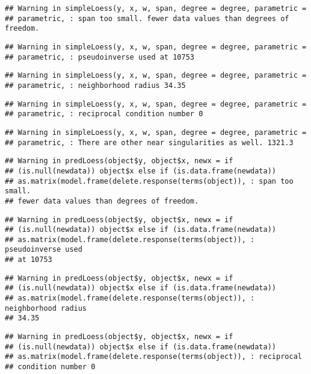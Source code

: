 \documentclass[]{article}
\begin{document}
\begin{verbatim}
## Warning in simpleLoess(y, x, w, span, degree = degree, parametric =
## parametric, : span too small. fewer data values than degrees of freedom.
\end{verbatim}

\begin{verbatim}
## Warning in simpleLoess(y, x, w, span, degree = degree, parametric =
## parametric, : pseudoinverse used at 10753
\end{verbatim}

\begin{verbatim}
## Warning in simpleLoess(y, x, w, span, degree = degree, parametric =
## parametric, : neighborhood radius 34.35
\end{verbatim}

\begin{verbatim}
## Warning in simpleLoess(y, x, w, span, degree = degree, parametric =
## parametric, : reciprocal condition number 0
\end{verbatim}

\begin{verbatim}
## Warning in simpleLoess(y, x, w, span, degree = degree, parametric =
## parametric, : There are other near singularities as well. 1321.3
\end{verbatim}

\begin{verbatim}
## Warning in predLoess(object$y, object$x, newx = if
## (is.null(newdata)) object$x else if (is.data.frame(newdata))
## as.matrix(model.frame(delete.response(terms(object)), : span too small.
## fewer data values than degrees of freedom.
\end{verbatim}

\begin{verbatim}
## Warning in predLoess(object$y, object$x, newx = if
## (is.null(newdata)) object$x else if (is.data.frame(newdata))
## as.matrix(model.frame(delete.response(terms(object)), : pseudoinverse used
## at 10753
\end{verbatim}

\begin{verbatim}
## Warning in predLoess(object$y, object$x, newx = if
## (is.null(newdata)) object$x else if (is.data.frame(newdata))
## as.matrix(model.frame(delete.response(terms(object)), : neighborhood radius
## 34.35
\end{verbatim}

\begin{verbatim}
## Warning in predLoess(object$y, object$x, newx = if
## (is.null(newdata)) object$x else if (is.data.frame(newdata))
## as.matrix(model.frame(delete.response(terms(object)), : reciprocal
## condition number 0
\end{verbatim}
\end{document}
